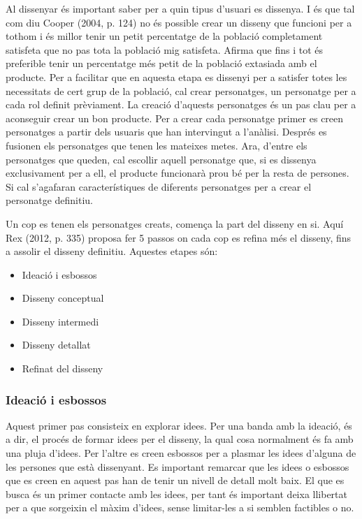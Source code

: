 Al dissenyar és important saber per a quin tipus d'usuari es dissenya. I és que tal com diu Cooper (2004, p. 124) \cite{Cooper} no és possible crear un disseny que funcioni per a tothom i és millor tenir un petit percentatge de la població completament satisfeta que no pas tota la població mig satisfeta. Afirma que fins i tot és preferible tenir un percentatge més petit de la població extasiada amb el producte. Per a facilitar que en aquesta etapa es dissenyi per a satisfer totes les necessitats de cert grup de la població, cal crear personatges, un personatge per a cada rol definit prèviament. La creació d'aquests personatges és un pas clau per a aconseguir crear un bon producte. Per a crear cada personatge primer es creen personatges a partir dels usuaris que han intervingut a l'anàlisi. Després es fusionen els personatges que tenen les mateixes metes. Ara, d'entre els personatges que queden, cal escollir aquell personatge que, si es dissenya exclusivament per a ell, el producte funcionarà prou bé per la resta de persones. Si cal s'agafaran característiques de diferents personatges per a crear el personatge definitiu. 

Un cop es tenen els personatges creats, comença la part del disseny en si. Aquí Rex (2012, p. 335) \cite{UX_Book} proposa fer 5 passos on cada cop es refina més el disseny, fins a assolir el disseny definitiu. Aquestes etapes són:

\begin{itemize}
\item Ideació i esbossos
\item Disseny conceptual
\item Disseny intermedi
\item Disseny detallat
\item Refinat del disseny
\end{itemize}


\subsubsection{Ideació i esbossos}
Aquest primer pas consisteix en explorar idees. Per una banda amb la ideació, és a dir, el procés de formar idees per el disseny, la qual cosa normalment és fa amb una pluja d'idees. Per l'altre es creen esbossos per a plasmar les idees d'alguna de les persones que està dissenyant. Es important remarcar que les idees o esbossos que es creen en aquest pas han de tenir un nivell de detall molt baix. El que es busca és un primer contacte amb les idees, per tant és important deixa llibertat per a que sorgeixin el màxim d'idees, sense limitar-les a si semblen factibles o no. 

